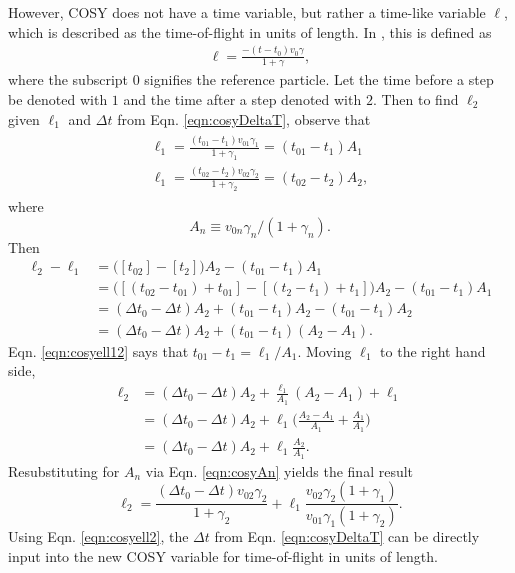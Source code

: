 However, COSY does not have a time variable, but rather a time-like variable $\ell$, which is described as the time-of-flight in units of length. In \cite{cosy}, this is defined as
\begin{align*}
\ell=\frac{-(t-t_0)v_0\gamma}{1+\gamma},
\end{align*}
where the subscript $0$ signifies the reference particle. Let the time before a step be denoted with $1$ and the time after a step denoted with $2$. Then to find $\ell_2$ given $\ell_1$ and $\Delta t$ from Eqn. \ref{eqn:cosyDeltaT}, observe that
\begin{align} \label{eqn:cosyell12}
\begin{split}
\ell_1=\frac{(t_{01}-t_1)v_{01}\gamma_1}{1+\gamma_1} = (t_{01}-t_1)A_1\\
\ell_1=\frac{(t_{02}-t_2)v_{02}\gamma_2}{1+\gamma_2} = (t_{02}-t_2)A_2,
\end{split}
\end{align}
where 
\begin{equation}\label{eqn:cosyAn}
A_n \equiv v_{0n}\gamma_n / (1+\gamma_n).
\end{equation}
Then
\begin{align*}
\ell_2 - \ell_1 &=\big([t_{02}]-[t_2]\big)A_2-(t_{01}-t_1)A_1\\
&=\big([(t_{02}-t_{01})+t_{01}]-[(t_2-t_1)+t_1]\big)A_2-(t_{01}-t_1)A_1\\
&=(\Delta t_0 - \Delta t )A_2 + (t_{01}-t_1)A_2-(t_{01}-t_1)A_2\\
&=(\Delta t_0 - \Delta t )A_2 + (t_{01}-t_1)(A_2-A_1).
\end{align*}
Eqn. \ref{eqn:cosyell12} says that $t_{01}-t_1=\ell_1/A_1$. Moving $\ell_1$ to the right hand side,
\begin{align*}
\ell_2 &= (\Delta t_0 - \Delta t)A_2 + \frac{\ell_1}{A_1}(A_2-A_1)+\ell_1\\
&=(\Delta t_0 - \Delta t)A_2 + \ell_1\Big(\frac{A_2-A_1}{A_1}+\frac{A_1}{A_1}\Big)\\
&=(\Delta t_0 - \Delta t)A_2 + \ell_1\frac{A_2}{A_1}.
\end{align*}
Resubstituting for $A_n$ via Eqn. \ref{eqn:cosyAn} yields the final result
\begin{equation}\label{eqn:cosyell2}
\ell_2=\frac{(\Delta t_0 - \Delta t) v_{02}\gamma_2}{1+\gamma_2}+\ell_1 \frac{v_{02}\gamma_2 (1+\gamma_1)}{v_{01}\gamma_1 (1+\gamma_2)}.
\end{equation}
Using Eqn. \ref{eqn:cosyell2}, the $\Delta t$ from Eqn. \ref{eqn:cosyDeltaT} can be directly input into the new COSY variable for time-of-flight in units of length.